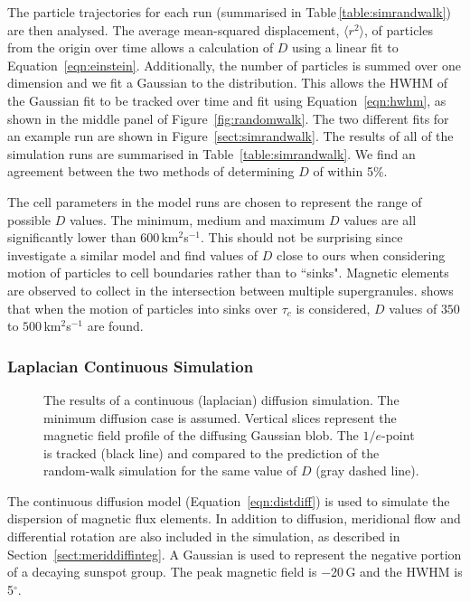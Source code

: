 The particle trajectories for each run (summarised in Table\,\ref{table:simrandwalk}) are then analysed. The average mean-squared displacement, $\langle r^2 \rangle$, of particles from the origin over time allows a calculation of $D$ using a linear fit to Equation~\ref{eqn:einstein}. Additionally, the number of particles is summed over one dimension and we fit a Gaussian to the distribution. This allows the \gls{HWHM} of the Gaussian fit to be tracked over time and fit using Equation~\ref{eqn:hwhm}, as shown in the middle panel of Figure~\ref{fig:randomwalk}. The two different fits for an example run are shown in Figure~\ref{sect:simrandwalk}. The results of all of the simulation runs are summarised in Table~\ref{table:simrandwalk}. We find an agreement between the two methods of determining $D$ of within 5$\%$. 

The cell parameters in the model runs are chosen to represent the range of possible $D$ values. The minimum, medium and maximum $D$ values are all significantly lower than 600\,km$^2$s$^{-1}$. This should not be surprising since \cite{Simon:1995} investigate a similar model and find values of $D$ close to ours when considering motion of particles to cell boundaries rather than to ``sinks". Magnetic elements are observed to collect in the intersection between multiple supergranules. \cite{Simon:1995} shows that when the motion of particles into sinks over $\tau_c$ is considered, $D$ values of $350$ to $500$\,km$^2$s$^{-1}$ are found.

\subsubsection{Laplacian Continuous Simulation}\label{sect:simcont}

\begin{figure}[!t]
\caption[Continuous diffusion simulation.]{The results of a continuous (laplacian) diffusion simulation. The minimum diffusion case is assumed. Vertical slices represent the magnetic field profile of the diffusing Gaussian blob. The $1/e$-point is tracked (black line) and compared to the prediction of the random-walk simulation for the same value of $D$ (gray dashed line).}
\label{fig:comprandcont}
\end{figure}

The continuous diffusion model (Equation~\ref{eqn:distdiff}) is used to simulate the dispersion of magnetic flux elements. In addition to diffusion, meridional flow and differential rotation are also included in the simulation, as described in Section~\ref{sect:meriddiffinteg}. 
A Gaussian is used to represent the negative portion of a decaying sunspot group. The peak magnetic field is $-$20\,G and the HWHM is 5$^{\circ}$. 

